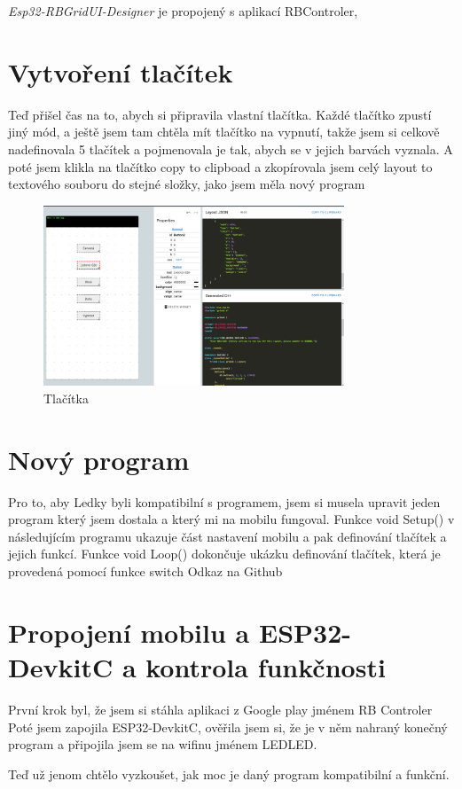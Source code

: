 {\em Esp32-RBGridUI-Designer} je propojený s aplikací RBControler, %

\section{Vytvoření tlačítek}
Teď přišel čas na to, abych si připravila vlastní tlačítka. Každé tlačítko zpustí jiný mód, a ještě jsem tam chtěla mít tlačítko na vypnutí, takže jsem si celkově nadefinovala 5 tlačítek a pojmenovala je tak, abych se v jejich barvách vyznala. A poté jsem klikla na tlačítko copy to clipboad a zkopírovala jsem celý layout to textového souboru do stejné složky, jako jsem měla nový program  


\begin{figure}[htbp]
	\centering
	\includegraphics[width=0.8\textwidth]{img/Esp32-RBGridUI-Designer - Tlačítka.png}
	\caption{Tlačítka}
\end{figure}

\section{Nový program} %
Pro to, aby Ledky byli kompatibilní s programem, jsem si musela upravit jeden program který jsem dostala a který mi na mobilu fungoval. %
Funkce void Setup() v následujícím programu ukazuje část nastavení mobilu a pak definování tlačítek a jejich funkcí. Funkce void Loop() dokončuje ukázku definování tlačítek, která je provedená pomocí funkce switch
Odkaz na Github





\section{Propojení mobilu a ESP32-DevkitC a kontrola funkčnosti}
První krok byl, že jsem si stáhla aplikaci z Google play jménem RB Controler %
Poté jsem zapojila ESP32-DevkitC, ověřila jsem si, že je v něm nahraný konečný program a připojila jsem se na wifinu jménem LEDLED. 


Teď už jenom chtělo vyzkoušet, jak moc je daný program kompatibilní a funkční. %

\newpage
